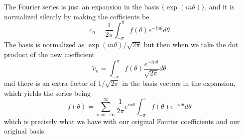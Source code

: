 \begin{rmk}
The Fourier series is just an expansion in the basis
$\{\exp(in\theta)\}$, and it is normalized silently by
making the cofficients be
\begin{equation}
c_n =
\frac{1}{2\pi}\int^{\pi}_{-\pi}f(\theta)e^{-in\theta}d\theta
\end{equation}
The basis is normalized as $\exp(in\theta)/\sqrt{2\pi}$ but
then when we take the dot product of the new coefficient
\begin{equation}
\widetilde{c}_n =
\int^{\pi}_{-\pi}f(\theta)\frac{e^{-in\theta}}{\sqrt{2\pi}}d\theta
\end{equation}
and there is an extra factor of $1/\sqrt{2\pi}$ in the basis
vectors in the expansion, which yields the series being
\begin{equation}
f(\theta) =
\sum^{\infty}_{n=-\infty}\frac{1}{2\pi}e^{in\theta}\int^{\pi}_{-\pi}f(\theta)e^{-in\theta}d\theta
\end{equation}
which is precisely what we have with our original Fourier
coefficients and our original basis.
\end{rmk}
